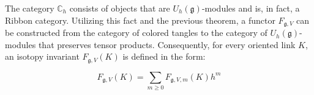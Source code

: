 \documentclass[11pt]{article}
\theoremstyle{definition}
\begin{document}
The category \(\mathbb{C}_h\) consists of objects that are \(U_h(\mathfrak{g})\)-modules and is, in fact, a Ribbon category. Utilizing this fact and the previous theorem, a functor \(F_{\mathfrak{g}, V}\) can be constructed from the category of colored tangles to the category of \(U_h(\mathfrak{g})\)-modules that preserves tensor products. Consequently, for every oriented link \(K\), an isotopy invariant \(F_{\mathfrak{g},V}(K)\) is defined in the form:

\[F_{\mathfrak{g},V}(K)=\sum_{m\geq 0}F_{\mathfrak{g},V,m}(K)h^m\]

\newpage
{}

\end{document}
